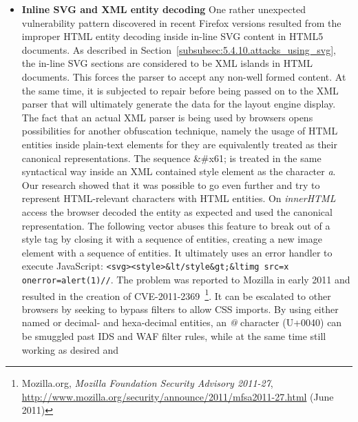 \begin{itemize}
{';x: expression(alert(1));'">}\\
     As it can be seen here, the \textit{font-family} value will be merged together with data from the second style attribute to contain only a semicolon and a whitespace. The following decoded CSS escape will first terminate the string, later terminate the property value pair with a semicolon, and then introduce a bogus property \textit{x} assigned with the value \textit{expression(alert(1))}, which will cause a JavaScript's execution.  These attacks are hard to detect, since the actual attack vector is fragmented over several style attributes and can thus easily evade IDS based filter rules. HTML filtering tools unaware of the DOM grammar of the content to filter have few chances of detecting these kinds of attack. Interestingly enough, this attack was not a working HTMLPurifier bypass, since this tool removes all additional style attributes nor does it attempt to merge them as the Internet Explorer layout engine does. The vulnerability has been reported and fixed for the current releases.
     \item \textbf{Inline SVG and XML entity decoding} One rather unexpected vulnerability pattern discovered in recent Firefox versions resulted from the improper HTML entity decoding inside in-line SVG content in HTML5 documents. As described in Section~\ref{subsubsec:5.4.10.attacks_using_svg}, the in-line SVG sections are considered to be XML islands in HTML documents. This forces the parser to accept any non-well formed content. At the same time, it is subjected to repair before being passed on to the XML parser that will ultimately generate the data for the layout engine display. The fact that an actual XML parser is being used by browsers opens possibilities for another obfuscation technique, namely the usage of HTML entities inside plain-text elements for they are equivalently treated as their canonical representations. The sequence \&\#x61; is treated in the same syntactical way inside an XML contained style element as the character \textit{a}. Our research showed that it was possible to go even 
further and try to represent HTML-relevant characters with HTML entities. On \textit{innerHTML} access the browser decoded the entity as expected and used the canonical representation. The following vector abuses this feature to break out of a style tag by closing it with a sequence of entities, creating a new image element with a sequence of entities. It ultimately uses an error handler to execute JavaScript: \texttt{<svg><style>\&lt/style\&gt;\&ltimg src=x onerror=alert(1)//}. The problem was reported to Mozilla in early 2011 and resulted in the creation of CVE-2011-2369~\footnote{Mozilla.org, \textit{Mozilla Foundation Security Advisory 2011-27}, \url{http://www.mozilla.org/security/announce/2011/mfsa2011-27.html} (June 2011)}. It can be escalated to other browsers by seeking to bypass filters to allow CSS imports. By using either named or decimal- and hexa-decimal entities, an \textit{@} character (U+0040) can be smuggled past IDS and WAF filter rules, while at the same time still working as desired and 

\end{itemize}
